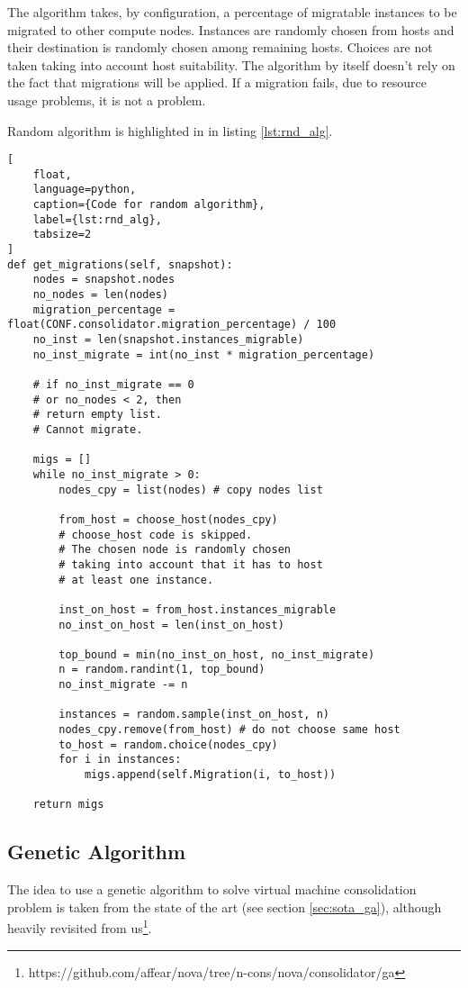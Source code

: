The algorithm takes, by configuration, a percentage of migratable instances to be migrated to other compute nodes. Instances are randomly chosen from hosts and their destination is randomly chosen among remaining hosts. Choices are not taken taking into account host suitability. The algorithm by itself doesn't rely on the fact that migrations will be applied. If a migration fails, due to resource usage problems, it is not a problem.

Random algorithm is highlighted in in listing \ref{lst:rnd_alg}.

\begin{lstlisting}[
	float,
	language=python,
	caption={Code for random algorithm},
	label={lst:rnd_alg},
	tabsize=2
]
def get_migrations(self, snapshot):
	nodes = snapshot.nodes
	no_nodes = len(nodes)
	migration_percentage = float(CONF.consolidator.migration_percentage) / 100
	no_inst = len(snapshot.instances_migrable)
	no_inst_migrate = int(no_inst * migration_percentage)

	# if no_inst_migrate == 0
	# or no_nodes < 2, then
	# return empty list.
	# Cannot migrate.

	migs = []
	while no_inst_migrate > 0:
		nodes_cpy = list(nodes) # copy nodes list

		from_host = choose_host(nodes_cpy)
		# choose_host code is skipped.
		# The chosen node is randomly chosen
		# taking into account that it has to host
		# at least one instance.

		inst_on_host = from_host.instances_migrable
		no_inst_on_host = len(inst_on_host)

		top_bound = min(no_inst_on_host, no_inst_migrate)
		n = random.randint(1, top_bound)
		no_inst_migrate -= n

		instances = random.sample(inst_on_host, n)
		nodes_cpy.remove(from_host) # do not choose same host
		to_host = random.choice(nodes_cpy)
		for i in instances:
			migs.append(self.Migration(i, to_host))

	return migs
\end{lstlisting}

\subsection{Genetic Algorithm}
\label{sub:algs_rnd}
The idea to use a genetic algorithm to solve virtual machine consolidation problem is taken from the state of the art (see section \ref{sec:sota_ga}), although heavily revisited from us\footnote{https://github.com/affear/nova/tree/n-cons/nova/consolidator/ga}.

